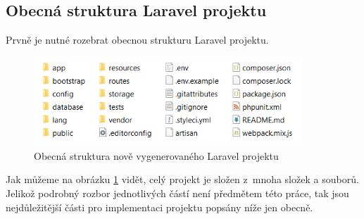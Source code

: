 	\subsection{Obecná struktura Laravel projektu}\label{sec:strukura_laravel}
	Prvně je nutné rozebrat obecnou strukturu Laravel projektu. 
		\begin{figure}[H]
			\centering %
			\includegraphics[width=0.9\textwidth]{img/laravel_struktura.png} %
			\caption{Obecná struktura nově vygenerovaného Laravel projektu} %
			\label{fig:laravel_str} %
		\end{figure}
	Jak můžeme na obrázku \ref{fig:laravel_str} vidět, celý projekt je složen z~mnoha složek a souborů. Jelikož podrobný rozbor jednotlivých částí není předmětem této práce, tak jsou nejdůležitější části pro implementaci projektu popsány níže jen obecně.
